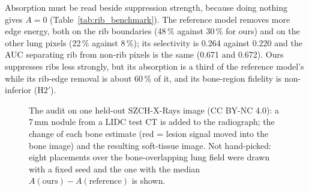 Absorption must be read beside suppression strength, because doing nothing gives $A=0$ (Table~\ref{tab:rib_benchmark}). The reference model
removes more edge energy, both on the rib boundaries (48\,\% against 30\,\% for ours) and on the other lung pixels (22\,\% against 8\,\%);
its selectivity is 0.264 against 0.220 and the AUC separating rib from non-rib pixels is the same (0.671 and 0.672). Ours suppresses ribs
less strongly, but its absorption is a third of the reference model's while its rib-edge removal is about 60\,\% of it, and its bone-region
fidelity is non-inferior (H2$'$).
\begin{table}[htbp]
\centering\small
\caption{Counterfactual lesion audit on VinDr-RibCXR: mean absorption per method with image-cluster bootstrap intervals (lower is better).}
\label{tab:audit_ribcxr}
\end{table}
\begin{table}[htbp]
\centering\small
\caption{H3$'$ paired site-level contrasts on the three audit sets, Holm over the two contrasts, and the interaction with bone overlap
($\geq$15\,\% vs.\ $<$15\,\%). SZCH rows: the 51 held-out images (306 sites), still development evidence because the audit on all 75 images
was used during development; the JSRT overlap comes from the reference model's bone map.}
\label{tab:audit_contrasts}
\end{table}
\begin{figure}[htbp]
\centering
{}
\caption{The audit on one held-out SZCH-X-Rays image (CC BY-NC 4.0): a 7\,mm nodule from a LIDC test CT is added to the radiograph; the change
of each bone estimate (red = lesion signal moved into the bone image) and the resulting soft-tissue image. Not hand-picked: eight placements
over the bone-overlapping lung field were drawn with a fixed seed and the one with the median $A(\text{ours})-A(\text{reference})$ is shown.}
\label{fig:audit_maps}
\end{figure}
\begin{table}[htbp]
\centering\small
\caption{Rib benchmark on VinDr-RibCXR (metrics only): gradient-energy reduction on rib-boundary pixels and on other lung pixels, selectivity
and AUC.}
\label{tab:rib_benchmark}
\end{table}

